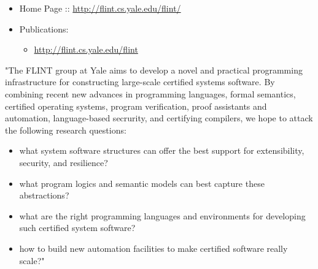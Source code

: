 \documentclass[12pt,twoside]{article}
\begin{document}
\begin{itemize}[noitemsep,topsep=\mdcompacttopsep]%

\item{}Home Page :: \href{http://flint.cs.yale.edu/flint/}{{\ttfamily http://\hspace{0pt}flint.\hspace{0pt}cs.\hspace{0pt}yale.\hspace{0pt}edu/\hspace{0pt}flint/\hspace{0pt}}}%

\item{}Publications:

\begin{itemize}[noitemsep,topsep=\mdcompacttopsep]%

\item{}\href{http://flint.cs.yale.edu/flint}{{\ttfamily http://\hspace{0pt}flint.\hspace{0pt}cs.\hspace{0pt}yale.\hspace{0pt}edu/\hspace{0pt}flint}}%
\end{itemize}%
\end{itemize}%

\noindent{}"The FLINT group at Yale aims to develop a novel and practical
programming infrastructure for constructing large-scale certified
systems software. By combining recent new advances in programming
languages, formal semantics, certified operating systems, program
verification, proof assistants and automation, language-based
secrurity, and certifying compilers, we hope to attack the following
research questions:%

\begin{itemize}[noitemsep,topsep=\mdcompacttopsep]%

\item{}what system software structures can offer the best support for extensibility, security, and resilience?%

\item{}what program logics and semantic models can best capture these abstractions?%

\item{}what are the right programming languages and environments for developing such certified system software?%

\item{}how to build new automation facilities to make certified software really scale?"%
\end{itemize}%
\end{document}
